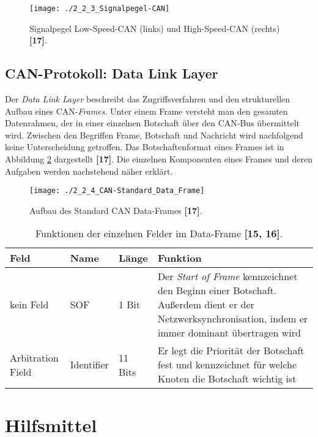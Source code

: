 \begin{figure}[!htbp]
	\centering
	\texttt{[image: ./2\_2\_3\_Signalpegel-CAN]}
	\caption[CAN-Signalpegel]{Signalpegel Low-Speed-\acs{CAN} (links) und High-Speed-\acs{CAN} (rechts) \textbf{[17]}.}
	\label{abb:CANSignalpegel}
\end{figure}

\subsection{CAN-Protokoll: Data Link Layer} \label{subsec:DataLinkLayer}
Der \emph{Data Link Layer} beschreibt das Zugriffsverfahren und den strukturellen Aufbau eines \acs{CAN}-\emph{Frames}. Unter einem Frame versteht man den gesamten Datenrahmen, der in einer einzelnen Botschaft über den \acs{CAN}-Bus übermittelt wird. Zwischen den Begriffen Frame, Botschaft und Nachricht wird nachfolgend keine Unterscheidung getroffen. Das Botschaftenformat eines Frames ist in Abbildung \ref{abb:CANDataFrame} dargestellt \textbf{[17]}. Die einzelnen Komponenten eines Frames und deren Aufgaben werden nachstehend näher erklärt.

\begin{figure}[!htbp]
	\centering
	\texttt{[image: ./2\_2\_4\_CAN-Standard\_Data\_Frame]}
	\caption[CAN-Signalpegel]{Aufbau des Standard \acs{CAN} Data-Frames \textbf{[17]}.}
	\label{abb:CANDataFrame}
\end{figure}

\begin{table}[!htbp]
	\centering
	\caption{Funktionen der einzelnen Felder im Data-Frame \textbf{[15, 16]}.}
	\renewcommand{\arraystretch}{1.3}
	\begin{tabular}{l l l p{7.5cm}}
		\toprule
		Feld              & Name       & Länge   & Funktion                                                                                                                                                  \\ \midrule
		kein Feld         & SOF        & 1 Bit   & Der \emph{Start of Frame} kennzeichnet den Beginn einer Botschaft. Außerdem dient er der Netzwerksynchronisation, indem er immer dominant übertragen wird \\
		Arbitration Field & Identifier & 11 Bits & Er legt die Priorität der Botschaft fest und kennzeichnet für welche Knoten die Botschaft wichtig ist                                                    \\ \bottomrule
	\end{tabular}
	
	\label{tab:CAN-Data-Frame}
\end{table}



\section{Hilfsmittel} \label{sec:Hilfsmittel} %


